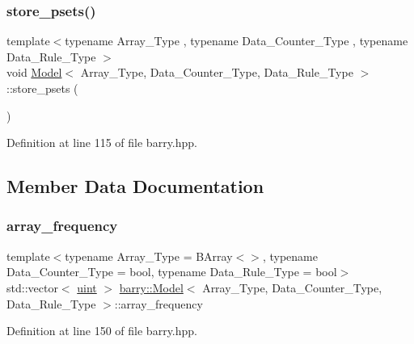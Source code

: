 \mbox{\label{classbarry_1_1_model_a06a6f52dfc6868908cf11e6663a93904}} 
\subsubsection{\texorpdfstring{store\+\_\+psets()}{store\_psets()}}
{\footnotesize\ttfamily template$<$typename Array\+\_\+\+Type , typename Data\+\_\+\+Counter\+\_\+\+Type , typename Data\+\_\+\+Rule\+\_\+\+Type $>$ \\
void \hyperlink{classbarry_1_1_model}{Model}$<$ Array\+\_\+\+Type, Data\+\_\+\+Counter\+\_\+\+Type, Data\+\_\+\+Rule\+\_\+\+Type $>$\+::store\+\_\+psets (\begin{DoxyParamCaption}{ }\end{DoxyParamCaption})\hspace{0.3cm}{\ttfamily [inline]}}



Definition at line 115 of file barry.\+hpp.



\subsection{Member Data Documentation}
\mbox{\label{classbarry_1_1_model_a64041df6ecac9aface20f9d13c0b22eb}} 
\subsubsection{\texorpdfstring{array\+\_\+frequency}{array\_frequency}}
{\footnotesize\ttfamily template$<$typename Array\+\_\+\+Type  = B\+Array$<$$>$, typename Data\+\_\+\+Counter\+\_\+\+Type  = bool, typename Data\+\_\+\+Rule\+\_\+\+Type  = bool$>$ \\
std\+::vector$<$ \hyperlink{namespacebarry_a11dfc53ddb4672278319aa04f1e09a6c}{uint} $>$ \hyperlink{classbarry_1_1_model}{barry\+::\+Model}$<$ Array\+\_\+\+Type, Data\+\_\+\+Counter\+\_\+\+Type, Data\+\_\+\+Rule\+\_\+\+Type $>$\+::array\+\_\+frequency}



Definition at line 150 of file barry.\+hpp.

